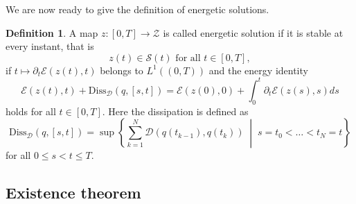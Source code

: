 \documentclass[a4paper,10pt,oneside]{amsbook}
\numberwithin{section}{chapter}
\numberwithin{equation}{chapter}
\theoremstyle{definition}
\newtheorem{defi}[prop]{Definition}
\begin{document}
We are now ready to give the definition of energetic solutions.
\begin{defi}
\label{def:energetic-solution}
A map $z\colon[0,T]\to\mathscr{Z}$ is called energetic solution if it is stable at every instant, that is
\begin{equation}
\text{$z(t)\in\mathscr{S}(t)$ for all $t\in[0,T]$},
\end{equation}
if $t\mapsto\partial_t\mathcal{E}(z(t),t)$ belongs to $L^1((0,T))$ and the energy identity
\[
\mathcal{E}(z(t),t)+\text{Diss}_{\mathcal{D}}(q,[s,t])=\mathcal{E}(z(0),0)+\int_0^t\partial_t\mathcal{E}(z(s),s)ds
\]
holds for all $t\in[0,T]$. Here the dissipation is defined as
\[
\text{Diss}_\mathcal{D}(q,[s,t])=\sup\left\{\sum_{k=1}^N\mathcal{D}(q(t_{k-1}),q(t_k))\;\middle|\;s=t_0<\dots<t_N=t\right\}
\]
for all $0\le s<t\le T$.
\end{defi}

\subsection{Existence theorem}
\end{document}
